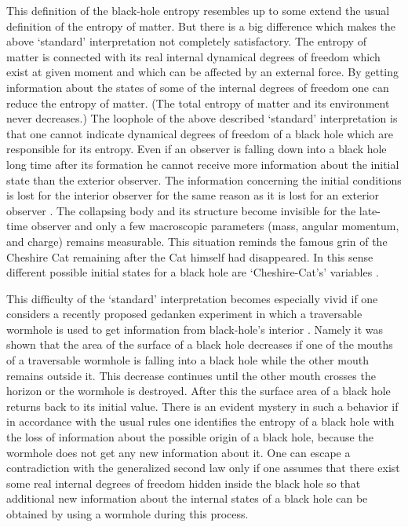 \documentclass[superscriptaddress,showpacs,preprintnumbers,amsmath,amssymb,
nofootinbib,aps,prd,12pt]{revtex4-1}
\begin{document}
This  definition  of  the  black-hole  entropy  resembles up to some
extend the usual definition of the  entropy of matter. But there is  a
big  difference  which  makes  the above `standard' interpretation not
completely  satisfactory.   The entropy of  matter is connected   with
its real internal dynamical degrees  of  freedom  which exist at given
moment and which can be affected by an external force. By  getting
information   about  the  states  of  some of the
internal degrees of freedom one can  reduce the  entropy  of   matter.
(The   total   entropy   of   matter   and     its  environment never
decreases.) The loophole of the above described  `standard'
interpretation is that  one cannot  indicate dynamical   degrees
of freedom of a black hole which are responsible for its entropy.
Even if an   observer is
falling  down into  a  black  hole  long  time  after  its   formation
he cannot receive   more information   about the  initial state  than the
exterior observer. The  information concerning the  initial conditions
is lost for the interior observer for the same  reason as it is   lost
for  an  exterior   observer  \cite{DoNo:78}. The collapsing body
and its structure become invisible for the late-time observer and
only a few macroscopic parameters (mass, angular momentum,
and charge) remains measurable. This situation
reminds the famous grin of the Cheshire Cat remaining after
the Cat himself had disappeared. In  this  sense different
possible  initial  states  for  a  black  hole  are  `Cheshire-Cat's'
variables \cite{note1}.

This difficulty  of the  `standard' interpretation  becomes especially
vivid if one considers a recently  proposed  gedanken  experiment   in
which  a  traversable  wormhole  is  used   to  get   information from
black-hole's interior   \cite{FrNo:93}.  Namely  it was shown  that the
area  of  the surface   of a   black hole   decreases if   one of  the
mouths  of  a traversable wormhole   is falling  into   a black  hole
while the other mouth remains outside it.
This decrease  continues until the  other mouth   crosses the
horizon or the wormhole is destroyed.  After   this the  surface area  of
a black hole  returns back  to its initial value.  There is an  evident
mystery in such a behavior  if in accordance with the   usual rules
one identifies the  entropy of a   black hole with the loss of information
about the possible origin of a black hole, because the wormhole does
not get any new information about it.     One  can escape  a
contradiction  with   the generalized  second  law only  if   one
assumes that there exist some real internal degrees of freedom
hidden inside the black hole so that   additional new information
about     the internal states   of  a black hole can be obtained
by using a wormhole during this process.
\end{document}
